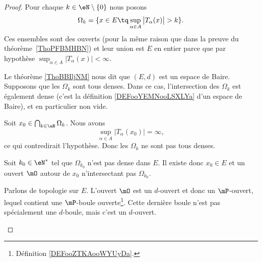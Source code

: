 \begin{proof}
	Pour chaque \( k\in \eN\setminus\{ 0 \}\) nous posons
	\begin{equation}
		\Omega_k=\{ x\in E\tq \sup_{\alpha\in A}\big| T_{\alpha}(x) \big|>k \}.
	\end{equation}
	Ces ensembles sont des ouverts (pour la même raison que dans la preuve du théorème~\ref{ThoPFBMHBN}) et leur union est \( E\) en entier parce que par hypothèse \( \sup_{\alpha\in A}\big| T_{\alpha}(x) \big|<\infty\).

	\begin{subproof}
		Le théorème \ref{ThoBBIljNM} nous dit que \( (E,d)\) est un espace de Baire. Supposons que les \( \Omega_k\) sont tous denses. Dans ce cas, l'intersection des \( \Omega_k\) est également dense (c'est la définition \ref{DEFooYEMNooLSXLYa} d'un espace de Baire), et en particulier non vide.

		Soit \( x_0\in\bigcap_{k\in \eN}\Omega_k\). Nous avons
		\begin{equation}
			\sup_{\alpha\in A}\big| T_{\alpha}(x_0) \big|=\infty,
		\end{equation}
		ce qui contredirait l'hypothèse. Donc les \( \Omega_k\) ne sont pas tous denses.

		Soit \( k_0\in \eN^*\) tel que \( \Omega_{k_0}\) n'est pas dense dans \( E\). Il existe donc \( x_0\in E\) et un ouvert \( \mO\) autour de \( x_0\) n'intersectant pas \( \Omega_{k_0}\).

		\spitem[Topologie]

		Parlons de topologie sur \( E\). L'ouvert \( \mO\) est un \( d\)-ouvert et donc un \( \mP\)-ouvert, lequel contient une \( \mP\)-boule ouverte\footnote{Définition \ref{DEFooZTKAooWYUyDa}.}. Cette dernière boule n'est pas spécialement une \( d\)-boule, mais c'est un \( d\)-ouvert.



\end{subproof}
\end{proof}
